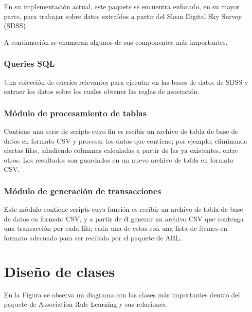 En su implementación actual, este paquete se encuentra enfocado, en su mayor parte, para trabajar sobre datos extraídos a partir del Sloan Digital Sky Survey (SDSS).

A continuación se enumeran algunos de sus componentes más importantes.

\subsubsection{Queries SQL}

Una colección de queries relevantes para ejecutar en las bases de datos de SDSS y extraer los datos sobre los cuales obtener las reglas de asociación.

\subsubsection{Módulo de procesamiento de tablas}

Contiene una serie de scripts cuyo fin es recibir un archivo de tabla de base de datos en formato CSV y procesar los datos que contiene; por ejemplo, eliminando ciertas filas, añadiendo columnas calculadas a partir de las ya existentes, entre otros. Los resultados son guardados en un nuevo archivo de tabla en formato CSV.

\subsubsection{Módulo de generación de transacciones}

Este módulo contiene scripts cuya función es recibir un archivo de tabla de base de datos en formato CSV, y a partir de él generar un archivo CSV que contenga una transacción por cada fila; cada una de estas con una lista de ítemes en formato adecuado para ser recibido por el paquete de ARL.

\section{Diseño de clases}

En la Figura \label{fig:arl_diag_clases} se observa un diagrama con las clases más importantes dentro del paquete de Association Rule Learning y sus relaciones.

